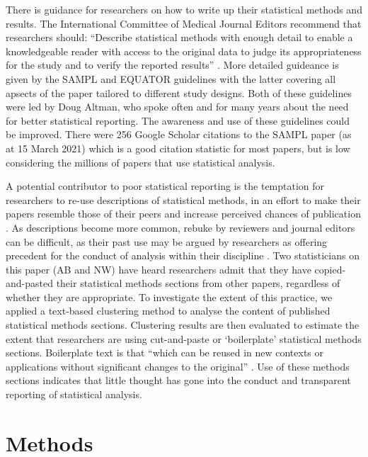 \documentclass[12pt]{article}
\begin{document}
There is guidance for researchers on how to write up their statistical
methods and results. The International Committee of Medical Journal
Editors recommend that researchers should: ``Describe statistical
methods with enough detail to enable a knowledgeable reader with access
to the original data to judge its appropriateness for the study and to
verify the reported results'' \citep{ICMJE2019}. More detailed guideance
is given by the SAMPL and EQUATOR guidelines
\citep{Lang2013, Altman2016} with the latter covering all apsects of the
paper tailored to different study designs. Both of these guidelines were led by Doug Altman, who spoke often
and for many years about the need for better statistical reporting. The
awareness and use of these guidelines could be improved. There were 256
Google Scholar citations to the SAMPL paper (as at 15 March 2021) which
is a good citation statistic for most papers, but is low considering the
millions of papers that use statistical analysis.

A potential contributor to poor statistical reporting is the temptation for researchers to re-use
descriptions of statistical methods, in an effort to make their papers resemble those of their peers 
and increase perceived chances of publication  \citep{Diong2018}. As descriptions become more common, rebuke by 
reviewers and journal editors can be difficult, as their past use may be argued by researchers as offering precedent for the 
conduct of analysis within their discipline \citep{Altman2002}. Two statisticians on this paper 
(AB and NW) have heard researchers admit
that they have copied-and-pasted their statistical methods sections from
other papers, regardless of whether they are appropriate. To investigate the extent of this practice, we applied a text-based 
clustering method to analyse the content of published statistical methods sections.
Clustering results are then evaluated to estimate the extent that researchers are
using cut-and-paste or `boilerplate' statistical methods sections.
Boilerplate text is that ``which can be reused in new contexts or
applications without significant changes to the original''
\citep{Wikipedia}. Use of these methods sections indicates that little
thought has gone into the conduct and transparent reporting of statistical analysis.

\hypertarget{methods}{%
\section{Methods}\label{methods}}
\end{document}
